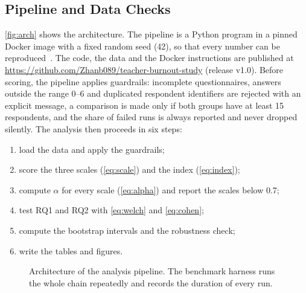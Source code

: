 \subsection{Pipeline and Data Checks}\label{sec:pipeline}
\autoref{fig:arch} shows the architecture. The pipeline is a Python program in
a pinned Docker image with a fixed random seed (42), so that every number can
be reproduced~\cite{boettiger2015docker}. The code, the data and the Docker
instructions are published at \url{https://github.com/Zhanb089/teacher-burnout-study}
(release v1.0). Before scoring, the pipeline applies guardrails: incomplete
questionnaires, answers outside the range 0--6 and duplicated respondent
identifiers are rejected with an explicit message, a comparison is made only if
both groups have at least 15 respondents, and the share of failed runs is always
reported and never dropped silently. The analysis then proceeds in six steps:
\begin{enumerate}\itemsep0pt
  \item load the data and apply the guardrails;
  \item score the three scales (\autoref{eq:scale}) and the index (\autoref{eq:index});
  \item compute $\alpha$ for every scale (\autoref{eq:alpha}) and report the scales below 0.7;
  \item test RQ1 and RQ2 with \autoref{eq:welch} and \autoref{eq:cohen};
  \item compute the bootstrap intervals and the robustness check;
  \item write the tables and figures.
\end{enumerate}

\begin{figure}[b]
  \centering
  \caption{Architecture of the analysis pipeline. The benchmark harness runs the
  whole chain repeatedly and records the duration of every run.}
  \label{fig:arch}
\end{figure}


